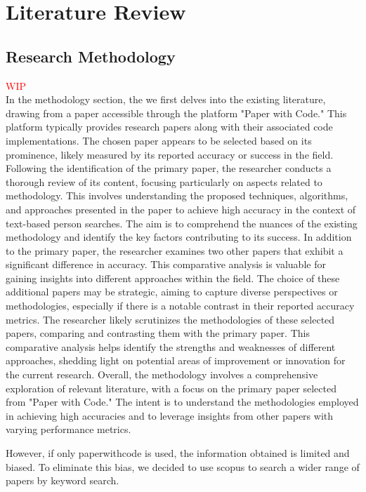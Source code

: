 \chapter{Literature Review}




\section{Research Methodology}
\textcolor{red}{WIP}\\
In the methodology section, the we first delves into the existing literature, drawing from a paper accessible through the platform "Paper with Code." This platform typically provides research papers along with their associated code implementations. The chosen paper appears to be selected based on its prominence, likely measured by its reported accuracy or success in the field.
Following the identification of the primary paper, the researcher conducts a thorough review of its content, focusing particularly on aspects related to methodology. This involves understanding the proposed techniques, algorithms, and approaches presented in the paper to achieve high accuracy in the context of text-based person searches. The aim is to comprehend the nuances of the existing methodology and identify the key factors contributing to its success.
In addition to the primary paper, the researcher examines two other papers that exhibit a significant difference in accuracy. This comparative analysis is valuable for gaining insights into different approaches within the field. The choice of these additional papers may be strategic, aiming to capture diverse perspectives or methodologies, especially if there is a notable contrast in their reported accuracy metrics.
The researcher likely scrutinizes the methodologies of these selected papers, comparing and contrasting them with the primary paper. This comparative analysis helps identify the strengths and weaknesses of different approaches, shedding light on potential areas of improvement or innovation for the current research.
Overall, the methodology involves a comprehensive exploration of relevant literature, with a focus on the primary paper selected from "Paper with Code." The intent is to understand the methodologies employed in achieving high accuracies and to leverage insights from other papers with varying performance metrics. 

However, if only paperwithcode is used, the information obtained is limited and biased. To eliminate this bias, we decided to use scopus to search a wider range of papers by keyword search.

